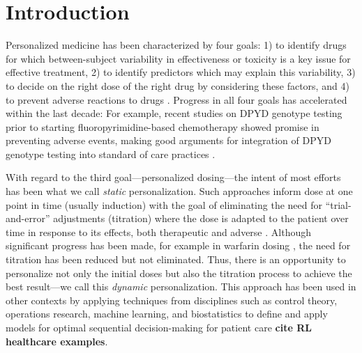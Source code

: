 \section{Introduction}

Personalized medicine has been characterized by four goals: 1) to identify drugs for which between-subject variability in effectiveness or toxicity is a key issue for effective treatment, 2) to identify predictors which may explain this variability, 3) to decide on the right dose of the right drug by considering these factors, and 4) to prevent adverse reactions to drugs \cite{morse2015personalized}.  Progress in all four goals has accelerated within the last decade: For example, recent studies on DPYD genotype testing prior to starting fluoropyrimidine-based chemotherapy showed promise in preventing adverse events, making good arguments for integration of DPYD genotype testing into standard of care practices \cite{wigle2019prospective}.  

With regard to the third goal---personalized dosing---the intent of most efforts has been what we call \textit{static} personalization. Such approaches inform dose at one point in time (usually induction) with the goal of eliminating the need for ``trial-and-error'' adjustments (titration) where the dose is adapted to the patient over time in response to its effects, both therapeutic and adverse \cite{morse2015personalized}. Although significant progress has been made, for example in warfarin dosing \cite{gong2011prospective}, the need for titration has been reduced but not eliminated. Thus, there is an opportunity to personalize not only the initial doses but also the titration process to achieve the best result---we call this \textit{dynamic} personalization. This approach has been used in other contexts by applying techniques from disciplines such as control theory, operations research, machine learning, and biostatistics to define and apply models for optimal sequential decision-making for patient care \textbf{cite RL healthcare examples}.

